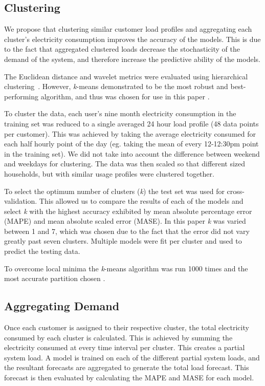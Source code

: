 \subsection{Clustering}

We propose that clustering similar customer load profiles and aggregating each cluster's electricity consumption improves the accuracy of the models. This is due to the fact that aggregated clustered loads decrease the stochasticity of the demand of the system, and therefore increase the predictive ability of the models.

The Euclidean distance and wavelet metrics were evaluated using hierarchical clustering~\cite{BIMJ:BIMJ4710240520}. However, \textit{k}-means demonstrated to be the most robust and best-performing algorithm, and thus was chosen for use in this paper \cite{Forgy65}.

To cluster the data, each user's nine month electricity consumption in the training set was reduced to a single averaged 24 hour load profile (48 data points per customer). This was achieved by taking the average electricity consumed for each half hourly point of the day (eg. taking the mean of every 12-12:30pm point in the training set). We did not take into account the difference between weekend and weekdays for clustering. The data was then scaled so that different sized households, but with similar usage profiles were clustered together.

To select the optimum number of clusters (\textit{k}) the test set was used for cross-validation. This allowed us to compare the results of each of the models and select \textit{k} with the highest accuracy exhibited by mean absolute percentage error (MAPE) and mean absolute scaled error (MASE). In this paper \textit{k} was varied between 1 and 7, which was chosen due to the fact that the error did not vary greatly past seven clusters. Multiple models were fit per cluster and used to predict the testing data.

To overcome local minima the \textit{k}-means algorithm was run 1000 times and the most accurate partition chosen \cite{Jain2010}.

\subsection{Aggregating Demand}

Once each customer is assigned to their respective cluster, the total electricity consumed by each cluster is calculated. This is achieved by summing the electricity consumed at every time interval per cluster. This creates a partial system load. A model is trained on each of the different partial system loads, and the resultant forecasts are aggregated to generate the total load forecast. This forecast is then evaluated by calculating the MAPE and MASE for each model. 


